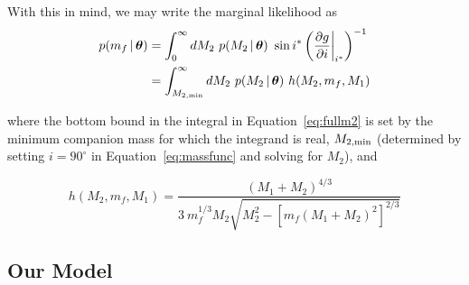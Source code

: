 \documentclass[apjl]{emulateapj}
\newcommand{\given}{\,|\,}
\newcommand{\bs}[1]{\boldsymbol{#1}}
\newcommand{\degree}{^{\circ}}
\newcommand{\eqn}{Equation~}
\newcommand{\mf}{m_f}
\begin{document}
With this in mind, we may write the marginal likelihood as
\begin{align}
	p(\mf \given \bs{\theta}) &= \int_{0}^\infty dM_2~p(M_2 \given \bs{\theta})~\sin i^* \left(\frac{\partial g}{\partial i}\bigg\rvert_{i^*}\right)^{-1}\\
	&= \int_{M_{2,{\rm min}}}^\infty dM_2~p(M_2 \given \bs{\theta})~h(M_2, \mf, M_1) \label{eq:fullm2}
\end{align}

where the bottom bound in the integral in \eqn\ref{eq:fullm2} is set by the minimum companion mass for which the integrand is real, $M_{2,{\rm min}}$ (determined by setting $i=90\degree$ in \eqn\ref{eq:massfunc} and solving for $M_2$), and

\begin{equation}
h(M_2, \mf, M_1) = \frac{(M_1+M_2)^{4/3}}{3\ \mf^{1/3}M_2\sqrt{M_2^2 - \left[ \mf(M_1+M_2)^2 \right]^{2/3}}}
\end{equation}


\subsection{Our Model} \label{sec:experiments}
\end{document}
